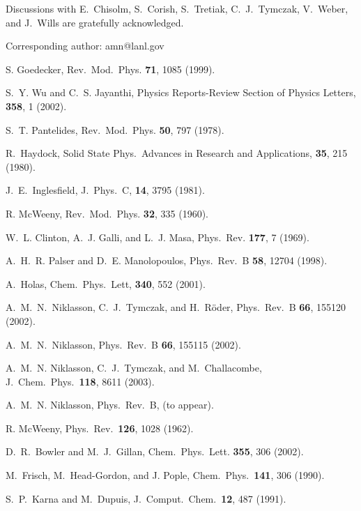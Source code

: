 Discussions with  E.\ Chisolm, S.\ Corish, S.\ Tretiak, C.\ J.\ Tymczak, V.\ Weber, 
and J.\ Wills are gratefully acknowledged.


\begin{references}

 Corresponding author: amn@lanl.gov

 S. Goedecker,
Rev.\ Mod.\ Phys. {\bf 71}, 1085 (1999).

 S.\ Y. Wu and C.\ S. Jayanthi,
Physics Reports-Review Section of Physics Letters, {\bf 358}, 1 (2002).

 S.\ T. Pantelides,
Rev.\ Mod.\ Phys. {\bf 50}, 797 (1978).

 R.\ Haydock, 
Solid State Phys.\ Advances in Research and Applications, {\bf 35}, 215 (1980).

 J.\ E.\ Inglesfield,
J.\ Phys.\ C, {\bf 14}, 3795 (1981).

 R. McWeeny,
Rev.\ Mod.\ Phys. {\bf 32}, 335 (1960).

 W.\ L. Clinton, A.\ J. Galli, and L.\ J. Masa,
Phys.\ Rev. {\bf 177}, 7 (1969).

 A.\ H.\ R. Palser and D.\ E. Manolopoulos,
Phys.\ Rev.\ B {\bf 58}, 12704 (1998).

 A.\ Holas,
Chem.\ Phys.\ Lett, {\bf 340}, 552 (2001).

 A.\ M.\ N.\ Niklasson, C.\ J.\ Tymczak, and H.\ R\"{o}der,
Phys.\ Rev.\ B {\bf 66}, 155120 (2002).

 A.\ M.\ N.\ Niklasson, 
Phys.\ Rev.\ B {\bf 66}, 155115 (2002). 

 A.\ M.\ N. Niklasson, C.\ J.\ Tymczak, and M.\ Challacombe,
J.\ Chem.\ Phys.\ {\bf 118}, 8611 (2003).

 A.\ M.\ N. Niklasson,
Phys.\ Rev.\ B, (to appear).

 R. McWeeny, 
Phys.\ Rev.\ {\bf 126}, 1028 (1962).

 D.\ R.\ Bowler and M.\ J.\ Gillan,
Chem.\ Phys.\ Lett. {\bf 355}, 306 (2002).

 M.\ Frisch, M.\ Head-Gordon, and J. Pople,
Chem.\ Phys.\ {\bf 141}, 306 (1990).

 S.\ P.\ Karna and M.\ Dupuis,
J.\ Comput.\ Chem.\ {\bf 12}, 487 (1991).


\end{references}
